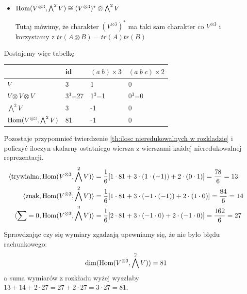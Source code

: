 \begin{example}
\begin{itemize}
      Alternatywnie można skorzystać z faktu, że jeśli $\chi$ jest charakterem reprezentacji $V$ to $g\mapsto\frac{1}{2}(\chi^2(g)-\chi(g^2))$ jest charakterem reprezentacji $V\wedge V$. Dlaczego? Bo jeśli $\lambda_1,...,\lambda_n$ to wartości własne $g$ na $V$, to $\lambda_i\lambda_j$, $i\neq j$, są wartościami własnymi $g$ na $V\wedge V$ (wystarczy wziąć $v_i$ że $gv_i=\lambda_i v_i$ i rozpisać). $\chi(g)=\sum \lambda_i$, więc $\chi(g)^2=\sum\lambda_i^2+2\sum \lambda_i\lambda_j$, ale $\sum\lambda_i2=\chi(g^2)$, a $\sum\lambda_i\lambda_j$ to ślad $g$ na $V\wedge V$.
    \item {\color{orange}$\operatorname{Hom}(V^{\otimes 3}, \bigwedge^2V)\cong (V^{\otimes 3})^*\otimes \bigwedge^2V$}

      Tutaj mówimy, że charakter $(V^{\otimes3})^*$ ma taki sam charakter co $V^{\otimes 3}$ i korzystamy z $tr(A\otimes B)=tr(A)tr(B)$
  \end{itemize}
  \bigskip 

  Dostajemy więc tabelkę
  \bigskip

  \begin{center}
    \begin{tabular}{|p{3cm}|p{2cm}|p{2cm}|p{2cm}|}
      \hline
      & id & $(a\;b)\times 3$ & $(a\;b\;c)\times 2$ \\ 
      \hline 
      $V$ & 3 & 1 & 0 \\ 
      \hline
      $V\otimes V\otimes V$ & 3${}^3$=27 & 1${}^3$=1 & 0${}^3$=0 \\ 
      \hline 
      $\bigwedge^2V$ & 3 & -1 & 0 \\ 
      \hline
      $\operatorname{Hom}(V^{\otimes3},\bigwedge^2V)$ & 81 & -1 & 0 \\ 
      \hline
    \end{tabular}
  \end{center}
  \vskip1.5cm

  Pozostaje przypomnieć twierdzenie \ref{th:ilosc nieredukowalnych w rozkladzie} i policzyć iloczyn skalarny ostatniego wiersza z wierszami każdej nieredukowalnej reprezentacji.
  \begin{align*}
    \langle \text{trywialna}, \operatorname{Hom}(V^{\otimes3}, \bigwedge^2V)\rangle&=\frac{1}{6}[1\cdot 81+3\cdot (1\cdot(-1))+2\cdot (0\cdot 1)]=\frac{78}{6}=13 \\ 
    \langle \text{znak},\operatorname{Hom}(V^{\otimes3},\bigwedge^2V)\rangle&=\frac{1}{6}[1\cdot 81+3\cdot(-1\cdot(-1))+2\cdot(1\cdot 0)]=\frac{84}{6}=14 \\ 
    \langle \sum=0,\operatorname{Hom}(V^{\otimes3},\bigwedge^2V)\rangle&=\frac{1}{6}[2\cdot 81+3\cdot(-1\cdot0)+2\cdot (-1\cdot 0)]=\frac{162}{6}=27
  \end{align*}

  Sprawdzając czy się wymiary zgadzają upewniamy się, że nie było błędu rachunkowego:
  $$\dim(\operatorname{Hom}(V^{\otimes3}, \bigwedge^2V))=81$$
  a suma wymiarów z rozkładu wyżej wyszłaby $13+14+2\cdot 27=27+2\cdot 27=3\cdot 27=81$.
\end{example}




%


